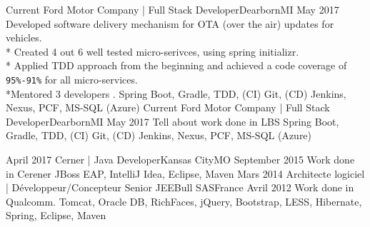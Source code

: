 \begin{experiences}
  \experience
    {Current}   
    	{Ford Motor Company | Full Stack Developer}{Dearborn}{MI} %
    {May 2017} {
        			Developed software delivery mechanism for OTA (over the air) updates for vehicles. 
           		\\* Created 4 out 6 well tested micro-serivces, using  spring initializr. 
           		\\* Applied TDD approach from the beginning and achieved a code coverage of \texttt{95\%-91\%} for all micro-services.
            		\\*Mentored 3 developers .
			}
			{Spring Boot, Gradle, TDD, (CI) Git, (CD) Jenkins, Nexus, PCF, MS-SQL (Azure)} %
  \emptySeparator
   \experience
    {Current}  
    	{Ford Motor Company | Full Stack Developer}{Dearborn}{MI} %
    {May 2017} {
                     	Tell about work done in LBS
                       }
                    {Spring Boot, Gradle, TDD, (CI) Git, (CD) Jenkins, Nexus, PCF, MS-SQL (Azure)} %
  \emptySeparator
  
  \experience
    {April 2017} 
    	{Cerner | Java Developer}{Kansas City}{MO} %
    {September 2015} {
                      		   Work done in Cerener
		                  }
		                  {JBoss EAP, IntelliJ Idea, Eclipse, Maven} %
  \emptySeparator
  \experience
    {Mars 2014}  
    	{Architecte logiciel | Développeur/Concepteur Senior JEE}{Bull SAS}{France} %
    {Avril 2012} {
      			Work done in Qualcomm. 
		      }
		      {Tomcat, Oracle DB, RichFaces, jQuery, Bootstrap, LESS, Hibernate, Spring, Eclipse, Maven} %
\end{experiences}
